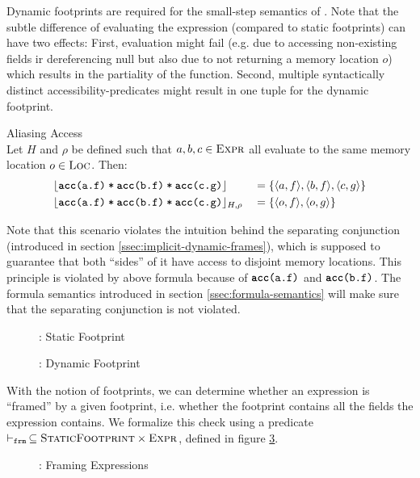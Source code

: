 \begin{description}
    Dynamic footprints are required for the small-step semantics of \svlidf.
    Note that the subtle difference of evaluating the expression (compared to static footprints) can have two effects:
    First, evaluation might fail (e.g. due to accessing non-existing fields ir dereferencing null but also due to not returning a memory location $o$) which results in the partiality of the function.
    Second, multiple syntactically distinct accessibility-predicates might result in one tuple for the dynamic footprint.
    \begin{example}{Aliasing Access}\\
        Let $H$ and $\rho$ be defined such that $a, b, c \in \setExpr$ all evaluate to the same memory location $o \in \setLoc$.
        Then:
        \begin{alignat*}{2}
        & \staticFP{\phiCons{\phiAcc{a}{f}}{\phiCons{\phiAcc{b}{f}}{\phiAcc{c}{g}}}} &&= \{ \langle a, f \rangle, \langle b, f \rangle, \langle c, g \rangle \}\\
        & \dynamicFP{H}{\rho}{\phiCons{\phiAcc{a}{f}}{\phiCons{\phiAcc{b}{f}}{\phiAcc{c}{g}}}} &&= \{ \langle o, f \rangle, \langle o, g \rangle \}
        \end{alignat*}
    \end{example}
    
    Note that this scenario violates the intuition behind the separating conjunction (introduced in section \ref{ssec:implicit-dynamic-frames}), which is supposed to guarantee that both “sides” of it have access to disjoint memory locations.
    This principle is violated by above formula because of $\phiAcc{a}{f}$ and $\phiAcc{b}{f}$.
    The formula semantics introduced in section \ref{ssec:formula-semantics} will make sure that the separating conjunction is not violated.
\end{description}
\begin{figure}[h]
    
    \caption{\svlidf: Static Footprint}
    \label{fig:sfp}
\end{figure}
\begin{figure}[h]
    
    \caption{\svlidf: Dynamic Footprint}
    \label{fig:dfp}
\end{figure}

With the notion of footprints, we can determine whether an expression is “framed” by a given footprint, i.e. whether the footprint contains all the fields the expression contains.
We formalize this check using a predicate $\sfrme \subseteq \setSFootprint \times \setExpr$, defined in figure \ref{fig:svl-frme}.
\begin{figure}
    
    \caption{\svlidf: Framing Expressions}
    \label{fig:svl-frme}
\end{figure}


